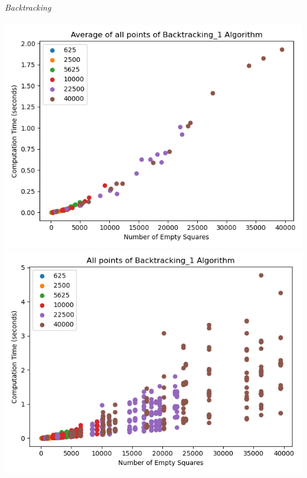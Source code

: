 \documentclass{article}
\begin{document}
\bigskip

\noindent \textit{Backtracking} \\ \\
\includegraphics[scale=0.5]{scatter_avg_Backtracking_1-3.png}
\includegraphics[scale=0.5]{scatter_Backtracking_1-3.png}

\bigskip
\end{document}

